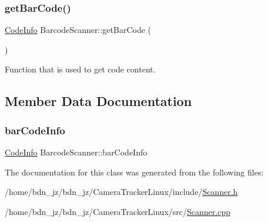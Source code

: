 \subsubsection{\texorpdfstring{get\+Bar\+Code()}{getBarCode()}}
{\footnotesize\ttfamily \hyperlink{struct_code_info}{Code\+Info} Barcode\+Scanner\+::get\+Bar\+Code (\begin{DoxyParamCaption}{ }\end{DoxyParamCaption})}



Function that is used to get code content. 



\subsection{Member Data Documentation}
\mbox{\label{class_barcode_scanner_a843ee092e719a72ed88002e89d9e9992}} 
\subsubsection{\texorpdfstring{bar\+Code\+Info}{barCodeInfo}}
{\footnotesize\ttfamily \hyperlink{struct_code_info}{Code\+Info} Barcode\+Scanner\+::bar\+Code\+Info\hspace{0.3cm}{\ttfamily [private]}}



The documentation for this class was generated from the following files\+:\begin{DoxyCompactItemize}
\item 
/home/bdn\+\_\+jz/bdn\+\_\+jz/\+Camera\+Tracker\+Linux/include/\hyperlink{_scanner_8h}{Scanner.\+h}\item 
/home/bdn\+\_\+jz/bdn\+\_\+jz/\+Camera\+Tracker\+Linux/src/\hyperlink{_scanner_8cpp}{Scanner.\+cpp}\end{DoxyCompactItemize}
